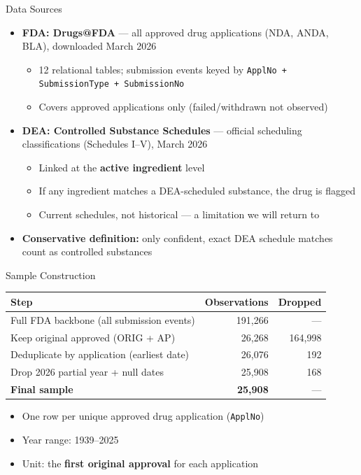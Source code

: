 \documentclass[10pt]{beamer}
\begin{document}
\begin{frame}[t]{Data Sources}
  \begin{itemize}
    \item \textbf{FDA: Drugs@FDA} --- all approved drug applications (NDA,
          ANDA, BLA), downloaded March 2026
          \begin{itemize}
            \item 12 relational tables; submission events keyed by
                  \texttt{ApplNo + SubmissionType + SubmissionNo}
            \item Covers approved applications only (failed/withdrawn not
                  observed)
          \end{itemize}
    \item \textbf{DEA: Controlled Substance Schedules} --- official scheduling
          classifications (Schedules I--V), March 2026
          \begin{itemize}
            \item Linked at the \textbf{active ingredient} level
            \item If any ingredient matches a DEA-scheduled substance, the drug
                  is flagged
            \item \alert{Current schedules, not historical} --- a limitation
                  we will return to
          \end{itemize}
    \item \textbf{Conservative definition:} only confident, exact DEA schedule
          matches count as controlled substances
  \end{itemize}
\end{frame}

\begin{frame}[t]{Sample Construction}
  \begin{center}
  \begin{tabular}{lrr}
    \toprule
    Step & Observations & Dropped \\
    \midrule
    Full FDA backbone (all submission events) & 191,266 & --- \\
    Keep original approved (ORIG + AP) & 26,268 & 164,998 \\
    Deduplicate by application (earliest date) & 26,076 & 192 \\
    Drop 2026 partial year + null dates & 25,908 & 168 \\
    \midrule
    \textbf{Final sample} & \textbf{25,908} & --- \\
    \bottomrule
  \end{tabular}
  \end{center}
  \medskip
  \begin{itemize}
    \item One row per unique approved drug application (\texttt{ApplNo})
    \item Year range: 1939--2025
    \item Unit: the \textbf{first original approval} for each application
  \end{itemize}
\end{frame}
\end{document}
